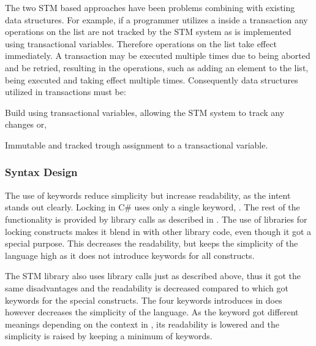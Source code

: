 The two \ac{STM} based approaches have been problems combining with existing data structures. For example, if a programmer utilizes a  inside a transaction any operations on the list are not tracked by the \ac{STM} system as  is implemented using transactional variables. Therefore operations on the list take effect immediately. A transaction may be executed multiple times due to being aborted and be retried, resulting in the operations, such as adding an element to the list, being executed and taking effect multiple times. Consequently data structures utilized in transactions must be: \begin{inparaenum}
  \item Build using transactional variables, allowing the \ac{STM} system to track any changes or,
  \item Immutable and tracked trough assignment to a transactional variable.
\end{inparaenum}  

\subsubsection{Syntax Design}\label{subsec:syntaxdesign}
The use of keywords reduce simplicity but increase readability, as the intent stands out clearly\cite[p. 12-13]{sebestaProLang}. Locking in C\# uses only a single keyword, . The rest of the functionality is provided by library calls as described in . The use of libraries for locking constructs makes it blend in with other library code, even though it got a special purpose. This decreases the readability, but keeps the simplicity of the language high as it does not introduce keywords for all constructs. 

The \ac{STM} library also uses library calls just as described above, thus it got the same disadvantages and the readability is decreased compared to \stmname which got keywords for the special constructs. The four keywords introduces in \stmname does however decreases the simplicity of the language. As the  keyword got different meanings depending on the context in \stmname, its readability is lowered and the simplicity is raised by keeping a minimum of keywords. 

